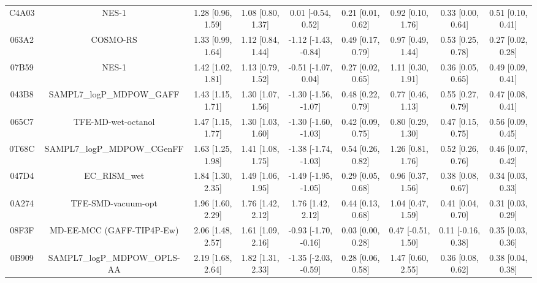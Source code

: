 \documentclass{article}
\begin{document}
\begin{center}
\begin{longtable}{|ccccccccc|}
 C4A03 &                                              NES-1 &  1.28 [0.96, 1.59] &  1.08 [0.80, 1.37] &    0.01 [-0.54, 0.52] &  0.21 [0.01, 0.62] &     0.92 [0.10, 1.76] &     0.33 [0.00, 0.64] &     0.51 [0.10, 0.41] \\
 063A2 &                                           COSMO-RS &  1.33 [0.99, 1.64] &  1.12 [0.84, 1.44] &  -1.12 [-1.43, -0.84] &  0.49 [0.17, 0.79] &     0.97 [0.49, 1.44] &     0.53 [0.25, 0.78] &     0.27 [0.02, 0.28] \\
 07B59 &                                              NES-1 &  1.42 [1.02, 1.81] &  1.13 [0.79, 1.52] &   -0.51 [-1.07, 0.04] &  0.27 [0.02, 0.65] &     1.11 [0.30, 1.91] &     0.36 [0.05, 0.65] &     0.49 [0.09, 0.41] \\
 043B8 &                          SAMPL7\_logP\_MDPOW\_GAFF &  1.43 [1.15, 1.71] &  1.30 [1.07, 1.56] &  -1.30 [-1.56, -1.07] &  0.48 [0.22, 0.79] &     0.77 [0.46, 1.13] &     0.55 [0.27, 0.79] &     0.47 [0.08, 0.41] \\
 065C7 &                                 TFE-MD-wet-octanol &  1.47 [1.15, 1.77] &  1.30 [1.03, 1.60] &  -1.30 [-1.60, -1.03] &  0.42 [0.09, 0.75] &     0.80 [0.29, 1.30] &     0.47 [0.15, 0.75] &     0.56 [0.09, 0.45] \\
 0T68C &                        SAMPL7\_logP\_MDPOW\_CGenFF &  1.63 [1.25, 1.98] &  1.41 [1.08, 1.75] &  -1.38 [-1.74, -1.03] &  0.54 [0.26, 0.82] &     1.26 [0.81, 1.76] &     0.52 [0.26, 0.76] &     0.46 [0.07, 0.42] \\
 047D4 &                                      EC\_RISM\_wet &  1.84 [1.30, 2.35] &  1.49 [1.06, 1.95] &  -1.49 [-1.95, -1.05] &  0.29 [0.05, 0.68] &     0.96 [0.37, 1.56] &     0.38 [0.08, 0.67] &     0.34 [0.03, 0.33] \\
 0A274 &                                 TFE-SMD-vacuum-opt &  1.96 [1.60, 2.29] &  1.76 [1.42, 2.12] &     1.76 [1.42, 2.12] &  0.44 [0.13, 0.68] &     1.04 [0.47, 1.59] &     0.41 [0.04, 0.70] &     0.31 [0.03, 0.29] \\
 08F3F &                          MD-EE-MCC (GAFF-TIP4P-Ew) &  2.06 [1.48, 2.57] &  1.61 [1.09, 2.16] &  -0.93 [-1.70, -0.16] &  0.03 [0.00, 0.28] &    0.47 [-0.51, 1.50] &    0.11 [-0.16, 0.38] &     0.35 [0.03, 0.36] \\
 0B909 &                       SAMPL7\_logP\_MDPOW\_OPLS-AA &  2.19 [1.68, 2.64] &  1.82 [1.31, 2.33] &  -1.35 [-2.03, -0.59] &  0.28 [0.06, 0.58] &     1.47 [0.60, 2.55] &     0.36 [0.08, 0.62] &     0.38 [0.04, 0.38] \\

\end{longtable}
\end{center}
\end{document}
